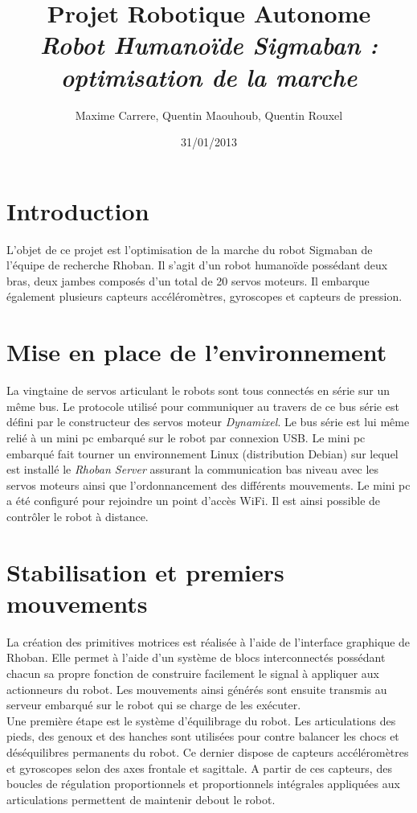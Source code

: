 \documentclass[11pt]{article}
\title{Projet Robotique Autonome\\
\textit{Robot Humanoïde Sigmaban : optimisation de la marche}}
\author{Maxime Carrere, Quentin Maouhoub, Quentin Rouxel}
\date{31/01/2013}
\begin{document}
\maketitle

\section{Introduction}

L'objet de ce projet est l'optimisation de la marche du robot Sigmaban de l'équipe 
de recherche Rhoban. Il s'agit d'un robot humanoïde possédant deux bras,
deux jambes composés d'un total de 20 servos moteurs. Il embarque également 
plusieurs capteurs accéléromètres, gyroscopes et capteurs de pression.

\section{Mise en place de l'environnement}

La vingtaine de servos articulant le robots sont tous connectés en série sur un même 
bus. Le protocole utilisé pour communiquer au travers de ce bus série est défini par le
constructeur des servos moteur \textit{Dynamixel}. Le bus série est lui même relié à un mini pc
embarqué sur le robot par connexion USB. Le mini pc embarqué fait tourner un environnement Linux
(distribution Debian) sur lequel est installé le \textit{Rhoban Server} assurant la communication
bas niveau avec les servos moteurs ainsi que l'ordonnancement des différents mouvements. Le mini pc
a été configuré pour rejoindre un point d'accès WiFi. Il est ainsi possible de contrôler le robot
à distance.

\section{Stabilisation et premiers mouvements}

La création des primitives motrices est réalisée à l'aide de l'interface graphique de Rhoban.
Elle permet à l'aide d'un système de blocs interconnectés possédant chacun sa propre fonction
de construire facilement le signal à appliquer aux actionneurs du robot. Les mouvements ainsi générés
sont ensuite transmis au serveur embarqué sur le robot qui se charge de les exécuter.\\

Une première étape est le système d'équilibrage du robot. Les articulations des pieds, des genoux 
et des hanches sont utilisées pour contre balancer les chocs et déséquilibres permanents
du robot. Ce dernier dispose de capteurs accéléromètres et gyroscopes selon des axes frontale et sagittale.
A partir de ces capteurs, des boucles de régulation proportionnels et proportionnels intégrales appliquées
aux articulations permettent de maintenir debout le robot.\\
\end{document}
